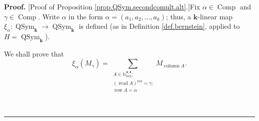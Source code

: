 \documentclass
[numbers=enddot,12pt,final,onecolumn,notitlepage,abstracton]{scrartcl}%
\theoremstyle{definition}
\newenvironment{proof}[1][Proof]{\noindent\textbf{#1.} }{\ \rule{0.5em}{0.5em}}
\let\sumnonlimits\sum
\renewcommand{\sum}{\sumnonlimits\limits}
\begin{document}
\begin{proof}
[Proof of Proposition \ref{prop.QSym.secondcomult.alt}.]Fix $\alpha
\in\operatorname*{Comp}$ and $\gamma\in\operatorname*{Comp}$. Write $\alpha$
in the form $\alpha=\left(  a_{1},a_{2},\ldots,a_{k}\right)  $; thus, a
$\mathbf{k}$-linear map $\xi_{\alpha}:\operatorname*{QSym}%
\nolimits_{\mathbf{k}}\rightarrow\operatorname*{QSym}\nolimits_{\mathbf{k}}$
is defined (as in Definition \ref{def.bernstein}, applied to
$H=\operatorname*{QSym}\nolimits_{\mathbf{k}}$).

We shall prove that
\begin{equation}
\xi_{\alpha}\left(  M_{\gamma}\right)  =\sum_{\substack{A\in\mathbb{N}%
_{\operatorname*{red}}^{\bullet,\bullet}\text{;}\\\left(  \operatorname*{read}%
A\right)  ^{\operatorname*{red}}=\gamma\text{;}\\\operatorname*{row}A=\alpha
}}M_{\operatorname*{column}A}. \label{pf.prop.QSym.secondcomult.alt.4}%
\end{equation}



\end{proof}
\end{document}

